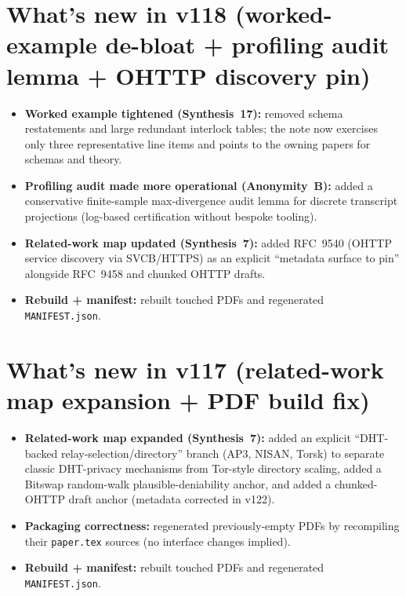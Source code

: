 \documentclass[11pt]{article}
\begin{document}
\section{What's new in v118 (worked-example de-bloat + profiling audit lemma + OHTTP discovery pin)}
\begin{itemize}[leftmargin=*]
\item \textbf{Worked example tightened (Synthesis~17):} removed schema restatements and large redundant interlock tables; the note now exercises only three representative line items and points to the owning papers for schemas and theory.
\item \textbf{Profiling audit made more operational (Anonymity~B):} added a conservative finite-sample max-divergence audit lemma for discrete transcript projections (log-based certification without bespoke tooling).
\item \textbf{Related-work map updated (Synthesis~7):} added RFC~9540 (OHTTP service discovery via SVCB/HTTPS) as an explicit ``metadata surface to pin'' alongside RFC~9458 and chunked OHTTP drafts.
\item \textbf{Rebuild + manifest:} rebuilt touched PDFs and regenerated \texttt{MANIFEST.json}.
\end{itemize}

\section{What's new in v117 (related-work map expansion + PDF build fix)}
\begin{itemize}[leftmargin=*]
\item \textbf{Related-work map expanded (Synthesis~7):} added an explicit ``DHT-backed relay-selection/directory'' branch (AP3, NISAN, Torsk) to separate classic DHT-privacy mechanisms from Tor-style directory scaling, added a Bitswap random-walk plausible-deniability anchor, and added a chunked-OHTTP draft anchor (metadata corrected in v122).
\item \textbf{Packaging correctness:} regenerated previously-empty PDFs by recompiling their \texttt{paper.tex} sources (no interface changes implied).
\item \textbf{Rebuild + manifest:} rebuilt touched PDFs and regenerated \texttt{MANIFEST.json}.
\end{itemize}
\end{document}
